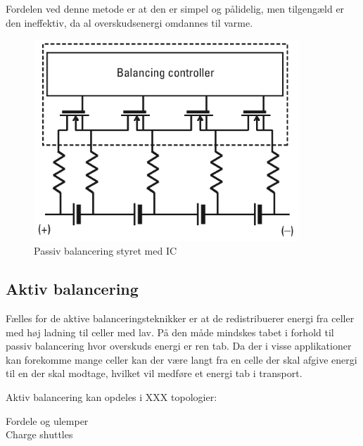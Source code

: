 Fordelen ved denne metode er at den er simpel og pålidelig, men tilgengæld er den ineffektiv, da al overskudsenergi omdannes til varme.

\begin{figure}[h]
	\centering
	\includegraphics[width=10cm]{billeder/passiv_balancering.png}
	\caption{Passiv balancering styret med IC}
	\label{fig:passiv_balancering}
\end{figure}




\subsection{Aktiv balancering}
Fælles for de aktive balanceringsteknikker er at de redistribuerer energi fra celler med høj ladning til celler med lav. På den måde mindskes tabet i forhold til passiv balancering hvor overskuds energi er ren tab. Da der i visse applikationer kan forekomme mange celler kan der være langt fra en celle der skal afgive energi til en der skal modtage, hvilket vil medføre et energi tab i transport.

Aktiv balancering kan opdeles i XXX topologier:

Fordele og ulemper
\\

Charge shuttles
\\

